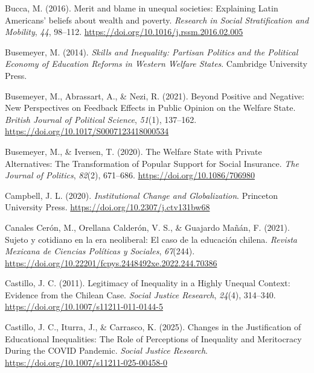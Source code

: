\documentclass[
  13pt,
]{article}
\newlength{\cslhangindent}
\newenvironment{CSLReferences}[2] %
 {\begin{list}{}{%
  \setlength{\itemindent}{0pt}
  \setlength{\leftmargin}{0pt}
  \setlength{\parsep}{0pt}
  \ifodd #1
   \setlength{\leftmargin}{\cslhangindent}
   \setlength{\itemindent}{-1\cslhangindent}
  \fi
  \setlength{\itemsep}{#2\baselineskip}}}
 {\end{list}}
\begin{document}
\begin{CSLReferences}{1}{0}
Bucca, M. (2016). Merit and blame in unequal societies: {Explaining
Latin Americans}' beliefs about wealth and poverty. \emph{Research in
Social Stratification and Mobility}, \emph{44}, 98--112.
\url{https://doi.org/10.1016/j.rssm.2016.02.005}

Busemeyer, M. (2014). \emph{Skills and {Inequality}: {Partisan Politics}
and the {Political Economy} of {Education Reforms} in {Western Welfare
States}}. Cambridge University Press.

Busemeyer, M., Abrassart, A., \& Nezi, R. (2021). Beyond {Positive} and
{Negative}: {New Perspectives} on {Feedback Effects} in {Public Opinion}
on the {Welfare State}. \emph{British Journal of Political Science},
\emph{51}(1), 137--162. \url{https://doi.org/10.1017/S0007123418000534}

Busemeyer, M., \& Iversen, T. (2020). The {Welfare State} with {Private
Alternatives}: {The Transformation} of {Popular Support} for {Social
Insurance}. \emph{The Journal of Politics}, \emph{82}(2), 671--686.
\url{https://doi.org/10.1086/706980}

Campbell, J. L. (2020). \emph{Institutional {Change} and
{Globalization}}. Princeton University Press.
\url{https://doi.org/10.2307/j.ctv131bw68}

Canales Cerón, M., Orellana Calderón, V. S., \& Guajardo Mañán, F.
(2021). Sujeto y cotidiano en la era neoliberal: El caso de la
educaci{ó}n chilena. \emph{Revista Mexicana de Ciencias Pol{í}ticas y
Sociales}, \emph{67}(244).
\url{https://doi.org/10.22201/fcpys.2448492xe.2022.244.70386}

Castillo, J. C. (2011). Legitimacy of {Inequality} in a {Highly Unequal
Context}: {Evidence} from the {Chilean Case}. \emph{Social Justice
Research}, \emph{24}(4), 314--340.
\url{https://doi.org/10.1007/s11211-011-0144-5}

Castillo, J. C., Iturra, J., \& Carrasco, K. (2025). Changes in the
{Justification} of {Educational Inequalities}: {The Role} of
{Perceptions} of {Inequality} and {Meritocracy During} the {COVID
Pandemic}. \emph{Social Justice Research}.
\url{https://doi.org/10.1007/s11211-025-00458-0}


\end{CSLReferences}
\end{document}
